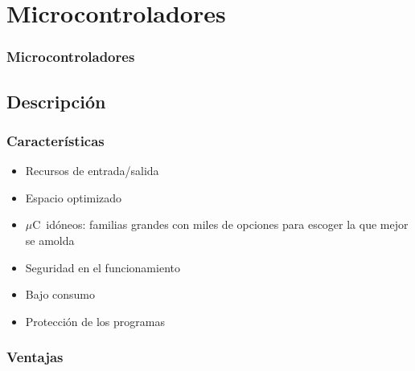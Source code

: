 \documentclass[handout,xcolor=dvipsnames]{beamer}
\newcommand{\uC}{\ensuremath{\mu\textrm{C}}\ }
\newcommand{\pageframe}[1]{\frame{\begin{center}{ \Huge #1 }\end{center}}}
\begin{document}
\section[$\mu C$]{Microcontroladores}

\begin{frame}
   \frametitle{Microcontroladores}

\end{frame}


\subsection{Descripción}
\pageframe{Descripción}
\begin{frame}[t]
  \frametitle{Características}
  \begin{block}{}
    \begin{itemize}[<+->]
      \item Recursos de entrada/salida 
      \item Espacio optimizado 
      \item \uC idóneos: familias grandes con miles de opciones para escoger la que mejor se amolda
      \item Seguridad en el funcionamiento 
      \item Bajo consumo 
      \item Protección de los programas 
    \end{itemize}

  \end{block}
 
\end{frame}
\begin{frame}[t]
  \frametitle{Ventajas}

\end{frame}
\end{document}
